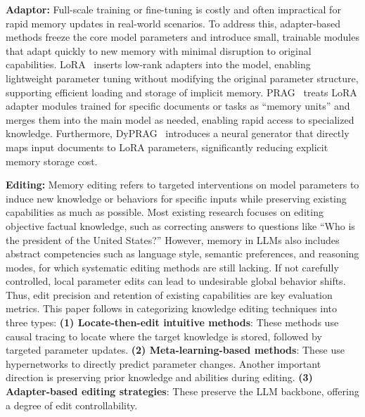 \documentclass[]{memtensor}
\begin{document}
\textbf{Adaptor:}
Full-scale training or fine-tuning is costly and often impractical for rapid memory updates in real-world scenarios.
To address this, adapter-based methods freeze the core model parameters and introduce small, trainable modules that adapt quickly to new memory with minimal disruption to original capabilities.
LoRA~\cite{hu_lora_2021} inserts low-rank adapters into the model, enabling lightweight parameter tuning without modifying the original parameter structure, supporting efficient loading and storage of implicit memory.
PRAG~\cite{su_PRAG_2025} treats LoRA adapter modules trained for specific documents or tasks as “memory units” and merges them into the main model as needed, enabling rapid access to specialized knowledge.
Furthermore, DyPRAG~\cite{tan_DyPRAG_2025} introduces a neural generator that directly maps input documents to LoRA parameters, significantly reducing explicit memory storage cost.

\textbf{Editing:}
Memory editing refers to targeted interventions on model parameters to induce new knowledge or behaviors for specific inputs while preserving existing capabilities as much as possible.
Most existing research focuses on editing objective factual knowledge, such as correcting answers to questions like “Who is the president of the United States?”
However, memory in LLMs also includes abstract competencies such as language style, semantic preferences, and reasoning modes, for which systematic editing methods are still lacking.
If not carefully controlled, local parameter edits can lead to undesirable global behavior shifts. Thus, edit precision and retention of existing capabilities are key evaluation metrics.
This paper follows \cite{yao_KESurvey_2023} in categorizing knowledge editing techniques into three types:
\textbf{(1) Locate-then-edit intuitive methods}\cite{meng_rome_2023,meng_memit_2023,xu_biasedit_2025}: These methods use causal tracing to locate where the target knowledge is stored, followed by targeted parameter updates.
\textbf{(2) Meta-learning-based methods}\cite{cao_KnowledgeEditor_2021,mitchell_mend_2021,tan_malmen_2023}: These use hypernetworks to directly predict parameter changes. Another important direction is preserving prior knowledge and abilities during editing\cite{fang_alphaedit_2025,jiang_anyedit_2025,li_AdaPLE_2024}.
\textbf{(3) Adapter-based editing strategies}\cite{dong_CaliNet_2022,mitchell_serac_2022,hartvigsen_grace_2023,cheng_DPM_2023}: These preserve the LLM backbone, offering a degree of edit controllability.
\end{document}
